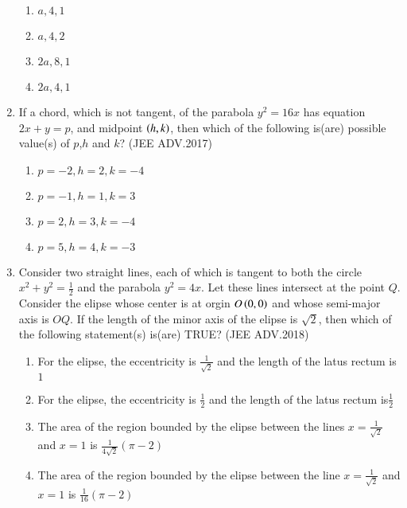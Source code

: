 \documentclass[journal,12pt,twocolumn]{IEEEtran}
\theoremstyle{remark}
\begin{document}
\begin{enumerate}
	      \begin{enumerate}
		      \item $a,4,1$
		      \item $a,4,2$
		      \item $2a,8,1$
		      \item $2a,4,1$
	      \end{enumerate}
      \item If a chord, which is not tangent, of the parabola $y^2=16x$ has equation $2x+y=p$, and midpoint $\left(h,k\right)$, then which of the following is(are) possible value(s) of $p$,$h$ and $k$? 
	      \hfill(JEE ADV.2017)
	      
	      \begin{enumerate}
		      \item $p=-2,h=2,k=-4$
		      \item $p=-1,h=1,k=3$
		      \item $p=2,h=3,k=-4$
		      \item $p=5,h=4,k=-3$


	      \end{enumerate}
      \item Consider two straight lines, each of which is tangent to both the circle $x^2+y^2=\frac{1}{2}$
	      and the parabola $y^2=4x$. Let these lines intersect at the point $Q$. Consider the elipse whose center is at orgin $O\left(0,0\right)$ and whose semi-major axis is $OQ$.
	      If the length of the minor axis of the elipse is $\sqrt{2}$, then which of the following statement(s) is(are) TRUE? 
	      \hfill(JEE ADV.2018)
	      
	      \begin{enumerate}
		      \item For the elipse, the eccentricity is $\frac{1}{\sqrt{2}}$ and the length of the latus rectum is $1$

		      \item For the elipse, the eccentricity is $\frac{1}{2}$ and the length of the latus rectum is$\frac{1}{2}$
		      \item The area of the region bounded by the elipse between the lines $x=\frac{1}{\sqrt{2}}$ and $x=1$ is $\frac{1}{4\sqrt{2}}(\pi-2)$
		      \item The area of the region bounded by the elipse between the line $x=\frac{1}{\sqrt{2}}$ and $x=1$ is $\frac{1}{16}(\pi-2)$
	      \end{enumerate}

\end{enumerate}
\end{document}
